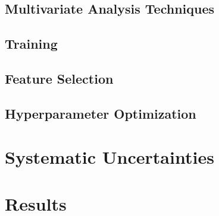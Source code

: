 		\subsection{Multivariate Analysis Techniques}\label{ssec:mva}

		\subsection{Training}\label{ssec:training}

		\subsection{Feature Selection}\label{ssec:features}

		\subsection{Hyperparameter Optimization}\label{ssec:hpo}

	\section{Systematic Uncertainties}\label{sec:systs}

	\section{Results}\label{sec:results}

